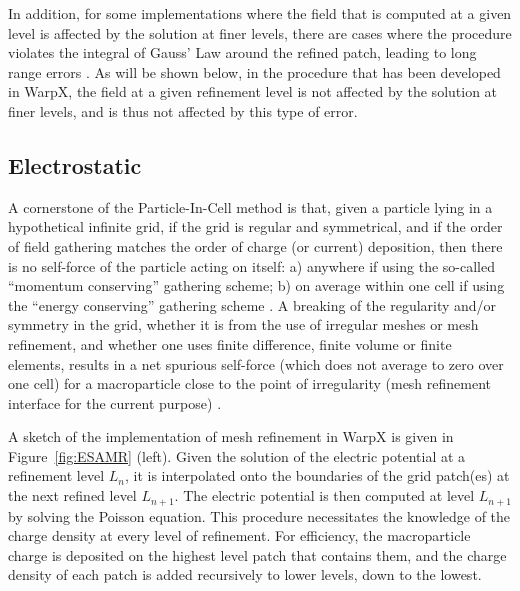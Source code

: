 In addition, for some implementations where the field that is computed at a given level is affected by the solution at finer levels, there are cases where the procedure violates the integral of Gauss' Law around the refined patch, leading to long range errors \cite{Vaylpb2002,Colellajcp2010}. As will be shown below, in the procedure that has been developed in WarpX, the field at a given refinement level is not affected by the solution at finer levels, and is thus not affected by this type of error.

\subsection{Electrostatic}
A cornerstone of the Particle-In-Cell method is that, given a particle lying in a hypothetical infinite grid, if the grid is regular and symmetrical, and if the order of field gathering matches the order of charge (or current) deposition, then there is no self-force of the particle acting on itself: a) anywhere if using the so-called ``momentum conserving'' gathering scheme; b) on average within one cell if using the ``energy conserving'' gathering scheme \cite{Birdsalllangdon}. A breaking of the regularity and/or symmetry in the grid, whether it is from the use of irregular meshes or mesh refinement, and whether one uses finite difference, finite volume or finite elements, results in a net spurious self-force (which does not average to zero over one cell)  for a macroparticle close to the point of irregularity (mesh refinement interface for the current purpose) \cite{Vaylpb2002,Colellajcp2010}.

A sketch of the implementation of mesh refinement in WarpX is given in Figure~\ref{fig:ESAMR} (left). Given the solution of the electric potential at a refinement level $L_n$, it is interpolated onto the boundaries of the grid patch(es) at the next refined level $L_{n+1}$. The electric potential is then computed at level $L_{n+1}$ by solving the Poisson equation. This procedure necessitates the knowledge of the charge density at every level of refinement. For efficiency, the macroparticle charge is deposited on the highest level patch that contains them, and the charge density of each patch is added recursively to lower levels, down to the lowest.

